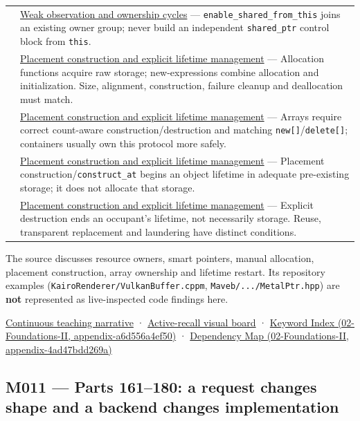 {\begin{longtable}[]{@{}
  >{\raggedright\arraybackslash}p{}
  >{\raggedright\arraybackslash}p{}@{}}
156 & \hyperref[appendix-b9548675eb2b]{Weak observation and ownership cycles} --- \texttt{enable\_shared\_from\_this} joins an existing owner group; never build an independent \texttt{shared\_ptr} control block from \texttt{this}. \\
157 & \hyperref[appendix-f56c3e43fd4e]{Placement construction and explicit lifetime management} --- Allocation functions acquire raw storage; new-expressions combine allocation and initialization. Size, alignment, construction, failure cleanup and deallocation must match. \\
158 & \hyperref[appendix-f56c3e43fd4e]{Placement construction and explicit lifetime management} --- Arrays require correct count-aware construction/destruction and matching \texttt{new{[}{]}}/\texttt{delete{[}{]}}; containers usually own this protocol more safely. \\
159 & \hyperref[appendix-f56c3e43fd4e]{Placement construction and explicit lifetime management} --- Placement construction/\texttt{construct\_at} begins an object lifetime in adequate pre-existing storage; it does not allocate that storage. \\
160 & \hyperref[appendix-f56c3e43fd4e]{Placement construction and explicit lifetime management} --- Explicit destruction ends an occupant's lifetime, not necessarily storage. Reuse, transparent replacement and laundering have distinct conditions. \\
\end{longtable}
}

The source discusses resource owners, smart pointers, manual allocation, placement construction, array ownership and lifetime restart. Its repository examples (\texttt{KairoRenderer/VulkanBuffer.cppm}, \texttt{Maveb/.../MetalPtr.hpp}) are \textbf{not} represented as live-inspected code findings here.

\href{Continuous\%20Notes/Computing\%20Foundations\%20-\%20From\%20Bits\%20to\%20C++\%20and\%20Systems\%20APIs\#From\%20a\%20live\%20object\%20to\%20responsible\%20resource\%20ownership}{Continuous teaching narrative} · \hyperref[appendix-960160274237]{Active-recall visual board} · \href{}{Keyword Index (02-Foundations-II, appendix-a6d556a4ef50)} · \href{}{Dependency Map (02-Foundations-II, appendix-4ad47bdd269a)}

\subsection{M011 --- Parts 161--180: a request changes shape and a backend changes implementation}\label{m011-parts-161180-a-request-changes-shape-and-a-backend-changes-implementation}

